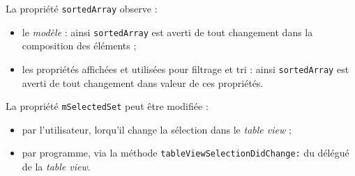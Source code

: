 



La propriété \texttt{sortedArray} observe :
\begin{itemize}
  \item le \emph{modèle} : ainsi  \texttt{sortedArray} est averti de tout changement dans la composition des éléments ;
  \item les propriétés affichées et utilisées pour filtrage et tri : ainsi  \texttt{sortedArray} est averti de tout changement dans valeur de ces propriétés.
\end{itemize}

La propriété \texttt{mSelectedSet} peut être modifiée :
\begin{itemize}
\item par l'utilisateur, lorqu'il change la sélection dans le \emph{table view} ;
\item par programme, via la méthode \texttt{tableViewSelectionDidChange:} du délégué de la \emph{table view}.
\end{itemize}
